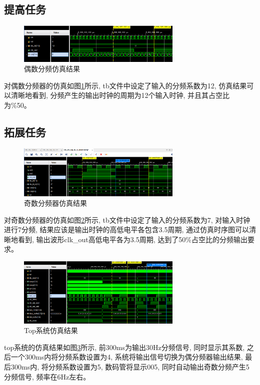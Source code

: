 \documentclass{article}
\begin{document}
\subsection*{提高任务}
\begin{figure}[H]
    \centering
    \includegraphics[width=0.7\textwidth]{image/2024-06-18-14-20-51.png}
    \caption{偶数分频仿真结果}
    \label{image_even_sim}
\end{figure}
对偶数分频器的仿真如图\ref{image_even_sim}所示, tb文件中设定了输入的分频系数为12, 仿真结果可以清晰地看到, 分频产生的输出时钟的周期为12个输入时钟, 并且其占空比为\%50。
\subsection*{拓展任务}
\begin{figure}[H]
    \centering
    \includegraphics[width=0.7\textwidth]{image/2024-06-18-16-01-10.png}
    \caption{奇数分频器仿真结果}
    \label{image_odd_sim}
\end{figure}
对奇数分频器的仿真如图\ref{image_odd_sim}所示, tb文件中设定了输入的分频系数为7, 对输入时钟进行7分频, 结果应该是输出时钟的高低电平各包含3.5周期, 通过仿真时序图可以清晰地看到, 输出波形clk\_out高低电平各为3.5周期, 达到了50\%占空比的分频输出要求。
\begin{figure}[htbp]
    \centering
    \includegraphics[width=0.7\textwidth]{image/2024-06-18-17-07-24.png}
    \caption{Top系统仿真结果}
    \label{image_top_sim}
\end{figure}
top系统的仿真结果如图\ref{image_top_sim}所示, 前300ms为输出30Hz分频信号, 同时显示其系数, 之后一个300ms内将分频系数设置为4, 系统将输出信号切换为偶分频器输出结果, 最后300ms内, 将分频系数设置为5, 数码管将显示005, 同时自动输出奇数分频产生5分频信号, 频率在6Hz左右。
\end{document}
